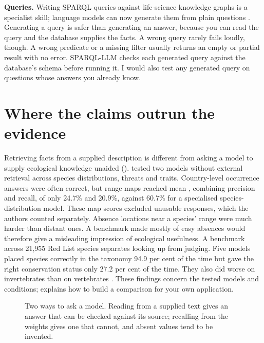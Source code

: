 \textbf{Queries.} Writing SPARQL queries against life-science knowledge graphs
is a specialist skill; language models can now generate them from plain
questions \parencite{smeros2025sparqlllm}. Generating a query is safer than
generating an answer, because you can read the query and the database supplies
the facts. A wrong query rarely fails loudly, though. A wrong predicate or a
missing filter usually returns an empty or partial result with no error.
SPARQL-LLM checks each generated query against the database's schema before
running it. I would also test any generated query on questions whose answers
you already know.

\section{Where the claims outrun the evidence}

Retrieving facts from a supplied description is different from asking a model
to supply ecological knowledge unaided (). \textcite{dorm2026ecologicalknowledge}
tested two models without external retrieval across species distributions,
threats and traits. Country-level occurrence answers were often correct, but
range maps reached mean , combining precision and recall, of
only 24.7\% and 20.9\%, against 60.7\%
for a specialised species-distribution model. These map scores excluded
unusable responses, which the authors counted separately. Absence locations
near a species' range were much harder than distant ones. A benchmark made
mostly of easy absences would therefore give a misleading impression of
ecological usefulness. A benchmark across 21,955 Red List species separates
looking up from judging. Five models placed species correctly in the taxonomy
94.9 per cent of the time but gave the right conservation status only 27.2 per
cent of the time. They also did worse on invertebrates than on vertebrates
\parencite{uryu2026redlist}. These findings concern the tested models and conditions;
 explains how to build a comparison for your own application.

\begin{figure}[htbp]
\centering
{}
\caption{Two ways to ask a model. Reading from a supplied text gives an answer
that can be checked against its source; recalling from the weights gives one
that cannot, and absent values tend to be invented.}
\label{fig:twoways}
\end{figure}

